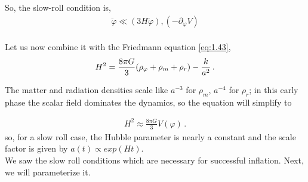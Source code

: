 So, the slow-roll condition is,
\begin{align}
     \ddot{\varphi} \ll (3H\dot{\varphi}),(-\partial_{\varphi} V )\label{1.2.31}
\end{align}\\
Let us now combine it with the Friedmann equation  \eqref{eq:1.43},
\begin{align}
    H^2 = \frac{8 \pi G}{3} \qty(\rho _\varphi + \rho _m + \rho _r) - \frac{k}{a^2}\,.
\end{align}

The matter and radiation densities scale like \(a^{-3}\) for \(\rho _m\), \(a^{-4}\) for \(\rho _r\); in this early phase the scalar field dominates the dynamics, so the equation will simplify to 

\begin{align} \label{1.2.33}
    H^2 \approx \frac{8 \pi G}{3} V(\varphi)\,.
\end{align}
so, for a slow roll case, the Hubble parameter is nearly a constant and the scale factor is given by $a(t) \propto exp(Ht)$.\\
\hspace{0.5cm} We saw the slow roll conditions which are necessary for successful inflation. Next, we will parameterize it.

